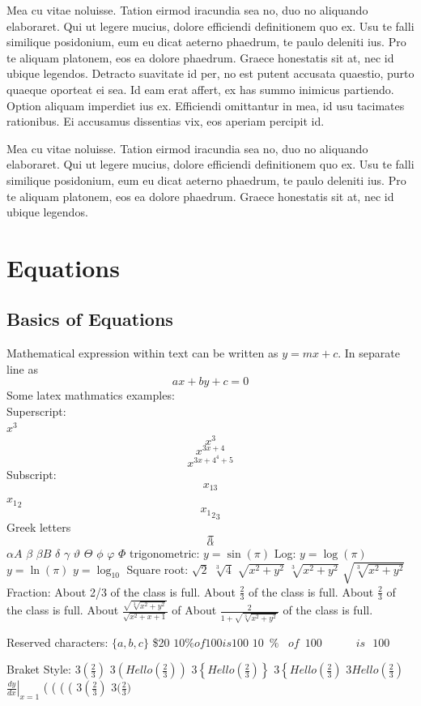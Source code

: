 Mea cu vitae noluisse. Tation eirmod iracundia sea no, duo no aliquando elaboraret. Qui ut legere mucius, dolore efficiendi definitionem quo ex. Usu te falli similique posidonium, eum eu dicat aeterno phaedrum, te paulo deleniti ius. Pro te aliquam platonem, eos ea dolore phaedrum. Graece honestatis sit at, nec id ubique legendos.
Detracto suavitate id per, no est putent accusata quaestio, purto quaeque oporteat ei sea. Id eam erat affert, ex has summo inimicus partiendo. Option aliquam imperdiet ius ex. Efficiendi omittantur in mea, id usu tacimates rationibus. Ei accusamus dissentias vix, eos aperiam percipit id.

Mea cu vitae noluisse. Tation eirmod iracundia sea no, duo no aliquando elaboraret. Qui ut legere mucius, dolore efficiendi definitionem quo ex. Usu te falli similique posidonium, eum eu dicat aeterno phaedrum, te paulo deleniti ius. Pro te aliquam platonem, eos ea dolore phaedrum. Graece honestatis sit at, nec id ubique legendos.
 
\chapter{Equations}

\section{Basics of Equations}
Mathematical expression within text can be written as $ y=mx+c $. In separate line as $$ ax + by + c = 0 $$
Some latex mathmatics examples:\\
Superscript:\\
$x^3$
$$x^3$$
$$x^{3x+4}$$
$$x^{{{3x+4}^4}+5}$$
Subscript:
$$x_{13}$$
${x_1}_2$
$${{{x_1}_2}_3}$$
Greek letters
$$\pi$$
$$\alpha$$
$\alpha A$
$\beta$
$\beta B$
$\delta$
$\gamma$
$\vartheta$
$\Theta$
$\phi$
$\varphi$
$\Phi$ 
trigonometric:
$y=\sin(\pi)$
Log:
$y=\log(\pi)$
$y=\ln(\pi)$
$y=\log_{10}$
Square root:
$\sqrt{2}$
$\sqrt[3]{4}$
$\sqrt{x^2+y^2}$
$\sqrt[3]{x^2+y^2}$
$\sqrt{\sqrt[3]{x^2+y^2}}$
Fraction:
About 2/3 of the class is full.
About $\frac{2}{3}$ of the class is full.
About $\displaystyle{\frac{2}{3}}$ of the class is full.
About $\displaystyle{\frac{\sqrt{\sqrt[3]{x^2+y^2}}}{\sqrt{x^2+x+1}}}$ of 
About $\displaystyle{\frac{2}{1+\sqrt{\sqrt[3]{x^2+y^2}}}}$ of the class is full.

Reserved characters:
$\{a,b,c\}$
\$20
$10\% of 100 is 100$
$10\,\,\,\% \;\;\; of \,\,\,100 \quad\qquad is\:\:\: 100$


Braket Style:
$3(\frac{2}{3})$
$3\left(Hello(\frac{2}{3})\right)$
$3\left\{Hello(\frac{2}{3})\right\}$
$3\left\{Hello(\frac{2}{3})\right.$
$3\left.Hello(\frac{2}{3})\right.$
$\left.\frac{dy}{dx}\right|_{x=1}$
( \big (  \Big (  \Bigg( 
$3(\frac{2}{3})$
$3\Big(\frac{2}{3}\Big)$

